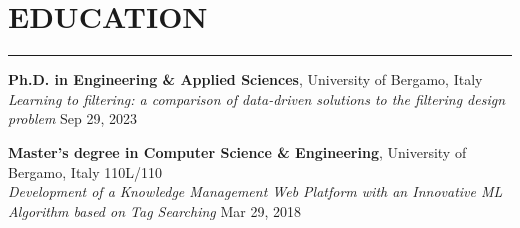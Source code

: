 \documentclass[10pt]{article}
\newcommand{\cvsection}[1]{\section*{\centering\normalsize\uppercase{#1}}\vspace{-16pt}\rule{\linewidth}{0.2pt}\vspace{6pt}}
\begin{document}
\cvsection{education}
\textbf{Ph.D. in Engineering \& Applied Sciences}, University of Bergamo, Italy\\
\textit{Learning to filtering: a comparison of data-driven solutions to the filtering design problem} \hfill Sep 29, 2023\\

\vspace{-10pt}

\textbf{Master's degree in Computer Science \& Engineering}, University of Bergamo, Italy \hfill 110L\slash110\\
\textit{Development of a Knowledge Management Web Platform with an Innovative ML Algorithm based on Tag Searching} \hfill Mar 29, 2018\\
\end{document}
